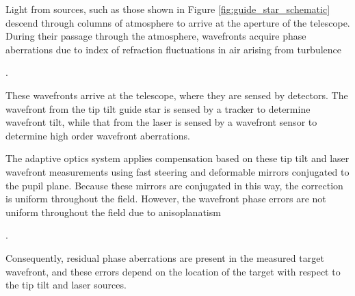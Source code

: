 Light from sources, such as those shown in Figure \ref{fig:guide_star_schematic} descend
through columns of atmosphere to arrive at the aperture of the
telescope.  During their passage through the atmosphere, wavefronts
acquire phase aberrations due to index of refraction fluctuations in
air arising from turbulence 
\begin{notes}
[CITE].
\end{notes}
These wavefronts arrive at the
telescope, where they are sensed by detectors.  The wavefront from the
tip tilt guide star is sensed by a tracker to determine wavefront
tilt, while that from the laser is sensed by a wavefront sensor to
determine high order wavefront aberrations.  

The adaptive optics system applies compensation based on these tip
tilt and laser wavefront measurements using fast steering and
deformable mirrors conjugated to the pupil plane.  Because these
mirrors are conjugated in this way, the correction is uniform
throughout the field.  However, the wavefront phase errors are not
uniform throughout the field due to anisoplanatism 
\begin{notes}
[CITE].
\end{notes} 
Consequently, residual phase aberrations are present in the measured target
wavefront, and these errors depend on the location of the target with
respect to the tip tilt and laser sources.

